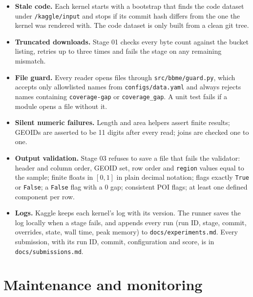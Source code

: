 \documentclass[11pt]{article}
\begin{document}
\begin{itemize}[itemsep=2pt]
\item \textbf{Stale code.} Each kernel starts with a bootstrap that finds the
code dataset under \texttt{/kaggle/input} and stops if its commit hash
differs from the one the kernel was rendered with. The code dataset is only
built from a clean git tree.
\item \textbf{Truncated downloads.} Stage 01 checks every byte count against
the bucket listing, retries up to three times and fails the stage on any
remaining mismatch.
\item \textbf{File guard.} Every reader opens files through
\texttt{src/bbme/guard.py}, which accepts only allowlisted names from
\texttt{configs/data.yaml} and always rejects names containing
\texttt{coverage-gap} or \texttt{coverage\_gap}. A unit test fails if a
module opens a file without it.
\item \textbf{Silent numeric failures.} Length and area helpers assert finite
results; GEOIDs are asserted to be 11 digits after every read; joins are
checked one to one.
\item \textbf{Output validation.} Stage 03 refuses to save a file that fails
the validator: header and column order, GEOID set, row order and
\texttt{region} values equal to the sample; finite floats in $[0, 1]$ in
plain decimal notation; flags exactly \texttt{True} or \texttt{False}; a
\texttt{False} flag with a 0 gap; consistent POI flags; at least one defined
component per row.
\item \textbf{Logs.} Kaggle keeps each kernel's log with its version. The
runner saves the log locally when a stage fails, and appends every run
(run ID, stage, commit, overrides, state, wall time, peak memory) to
\texttt{docs/experiments.md}. Every submission, with its run ID, commit,
configuration and score, is in \texttt{docs/submissions.md}.
\end{itemize}

\section{Maintenance and monitoring}
\end{document}
